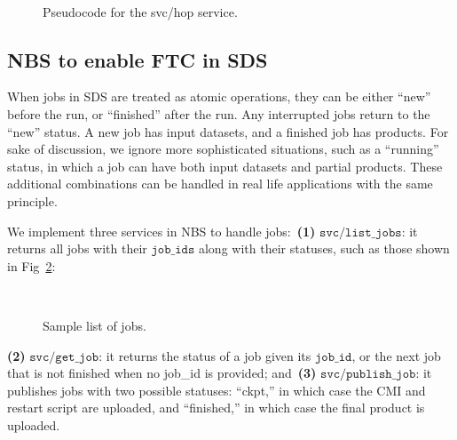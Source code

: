 \documentclass[conference]{IEEEtran}
\begin{document}
\begin{figure}[!ht]
\vspace{0.1in}
\begin{center}
\begin{center}
\mbox{}\\[0.3em]
\end{center}
\hspace{\fill}%
\caption{Pseudocode for the svc/hop service.}
\label{code:svc_hop}
\end{center}
\end{figure}


\subsection{NBS to enable FTC in SDS}
\label{subsec:s23}

When jobs in SDS are treated as atomic operations, they can be either ``new'' before the run, or ``finished'' after the run. Any interrupted jobs return to the ``new'' status. A new job has input datasets, and a finished job has products. For sake of discussion, we ignore more sophisticated situations, such as a ``running'' status, in which a job can have both input datasets and partial products. These additional combinations can be handled in real life applications with the same principle.

We implement three services in NBS to handle jobs:~\textbf{(1)} $\mathtt{svc/list\_jobs}$: it returns all jobs with their $\mathtt{job\_ids}$ along with their statuses, such as those shown in Fig~\ref{code:jobs}:

\begin{figure}[!ht]
\vspace{0.1in}
\begin{center}
\begin{center}
\mbox{}\\[0.3em]
\end{center}
\hspace{\fill}%
\caption{Sample list of jobs.}
\label{code:jobs}
\end{center}
\end{figure}

\textbf{(2)} $\mathtt{svc/get\_job}$: it returns the status of a job given its $\mathtt{job\_id}$, or the next job that is not finished when no job\_id is provided; and~\textbf{(3)} $\mathtt{svc/publish\_job}$: it publishes jobs with two possible statuses: ``ckpt,'' in which case the CMI and restart script are uploaded, and ``finished,'' in which case the final product is uploaded.
\end{document}
